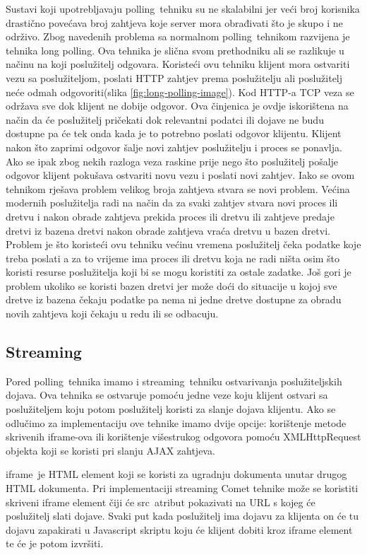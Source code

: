 \documentclass[times, utf8, zavrsni]{fer}
\begin{document}
Sustavi koji upotrebljavaju \glqq polling\grqq\  tehniku su ne skalabilni jer veći broj korisnika drastično povećava broj zahtjeva koje server mora obrađivati što je skupo i ne održivo. Zbog navedenih problema sa normalnom \glqq polling\grqq\  tehnikom razvijena je tehnika \glqq long polling\grqq . Ova tehnika je slična svom prethodniku ali se razlikuje u načinu na koji poslužitelj odgovara. Koristeći ovu tehniku klijent mora ostvariti vezu sa poslužiteljom, poslati HTTP zahtjev prema poslužitelju ali poslužitelj neće odmah odgovoriti(slika \ref{fig:long-polling-image}). Kod HTTP-a TCP veza se održava sve dok klijent ne dobije odgovor. Ova činjenica je ovdje iskorištena na način da će poslužitelj pričekati dok relevantni podatci ili dojave ne budu dostupne pa će tek onda kada je to potrebno poslati odgovor klijentu. Klijent nakon što zaprimi odgovor šalje novi zahtjev poslužitelju i proces se ponavlja. Ako se ipak zbog nekih razloga veza raskine prije nego što poslužitelj pošalje odgovor klijent pokušava ostvariti novu vezu i poslati novi zahtjev. Iako se ovom tehnikom rješava problem velikog broja zahtjeva stvara se novi problem. Većina modernih poslužitelja radi na način da za svaki zahtjev stvara novi proces ili dretvu i nakon obrade zahtjeva prekida proces ili dretvu ili zahtjeve predaje dretvi iz bazena dretvi nakon obrade zahtjeva  vraća dretvu u bazen dretvi. Problem je što koristeći ovu tehniku većinu vremena poslužitelj čeka podatke koje treba poslati a za to vrijeme ima proces ili dretvu koja ne radi ništa osim što koristi resurse poslužitelja koji bi se mogu koristiti za ostale zadatke. Još gori je problem ukoliko se koristi bazen dretvi jer može doći do situacije u kojoj sve dretve iz bazena čekaju podatke pa nema ni jedne dretve dostupne za obradu novih zahtjeva koji čekaju u redu ili se odbacuju.

\subsection{Streaming}
Pored \glqq polling\grqq\  tehnika imamo i \glqq streaming\grqq\  tehniku ostvarivanja poslužiteljskih dojava. Ova tehnika se ostvaruje pomoću jedne veze koju klijent ostvari sa poslužiteljem koju potom poslužitelj koristi za slanje dojava klijentu. Ako se odlučimo za implementaciju ove tehnike imamo dvije opcije: korištenje metode skrivenih iframe-ova ili korištenje višestrukog odgovora pomoću XMLHttpRequest objekta koji se koristi pri slanju AJAX zahtjeva.

\glqq iframe\grqq\  je HTML element koji se koristi za ugradnju dokumenta unutar drugog HTML dokumenta. Pri implementaciji streaming Comet tehnike može se koristiti skriveni iframe element čiji će \glqq src\grqq\  atribut pokazivati na URL s kojeg će poslužitelj slati dojave. Svaki put kada poslužitelj ima dojavu za klijenta on će tu dojavu zapakirati u Javascript skriptu koju će klijent dobiti kroz iframe element te će je potom izvršiti.
\end{document}

